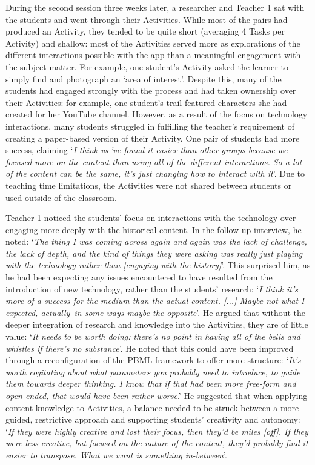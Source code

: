 \documentclass[,hyphens]{sigchi}
\begin{document}
During the second session three weeks later, a researcher and Teacher 1 sat with the students and went through their Activities. While most of the pairs had produced an Activity, they tended to be quite short (averaging 4 Tasks per Activity) and shallow: most of the Activities served more as explorations of the different interactions possible with the app than a meaningful engagement with the subject matter. For example, one student's Activity asked the learner to simply find and photograph an `area of interest'. Despite this, many of the students had engaged strongly with the process and had taken ownership over their Activities: for example, one student's trail featured characters she had created for her YouTube channel. However, as a result of the focus on technology interactions, many students struggled in fulfilling the teacher's requirement of creating a paper-based version of their Activity. One pair of students had more success, claiming `\textit{I think we've found it easier than other groups because we focused more on the content than using all of the different interactions. So a lot of the content can be the same, it's just changing how to interact with it}'. Due to teaching time limitations, the Activities were not shared between students or used outside of the classroom.

Teacher 1 noticed the students' focus on interactions with the technology over engaging more deeply with the historical content. In the follow-up interview, he noted: `\textit{The thing I was coming across again and again was the lack of challenge, the lack of depth, and the kind of things they were asking was really just playing with the technology rather than [engaging with the history]}'. This surprised him, as he had been expecting any issues encountered to have resulted from the introduction of new technology, rather than the students' research: `\textit{I think it's more of a success for the medium than the actual content. [...] Maybe not what I expected, actually--in some ways maybe the opposite}'. He argued that without the deeper integration of research and knowledge into the Activities, they are of little value: `\textit{It needs to be worth doing: there's no point in having all of the bells and whistles if there's no substance}'. He noted that this could have been improved through a reconfiguration of the PBML framework to offer more structure: `\textit{It's worth cogitating about what parameters you probably need to introduce, to guide them towards deeper thinking. I know that if that had been more free-form and open-ended, that would have been rather worse}.' He suggested that when applying content knowledge to Activities, a balance needed to be struck between a more guided, restrictive approach and supporting students' creativity and autonomy: `\textit{If they were highly creative and lost their focus, then they'd be miles [off]. If they were less creative, but focused on the nature of the content, they'd probably find it easier to transpose. What we want is something in-between}'.
\end{document}
